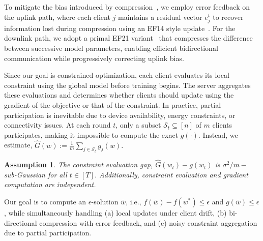 \documentclass{article} %
\newtheorem{assumption}[]{Assumption}
\begin{document}

To mitigate the bias introduced by compression~\citep{seide20141, karimireddy2019error, islamov2025safe}, we employ error feedback on the uplink path, where each client $j$ maintains a residual vector $e_j^t$ to recover information lost during compression using an EF14 style update~\citep{seide20141}. For the downlink path, we adopt a primal EF21 variant~\citep{gruntkowska2023ef21,islamov2025safe} that compresses the difference between successive model parameters, enabling efficient bidirectional communication while progressively correcting uplink bias.

Since our goal is constrained optimization, each client evaluates its local constraint using the global model before training begins. The server aggregates these evaluations and determines whether clients should update using the gradient of the objective or that of the constraint. In practice, partial participation is inevitable due to device availability, energy constraints, or connectivity issues. At each round $t$, only a subset $\mathcal{S}_t \subseteq [n]$ of $m$ clients participates, making it impossible to compute the exact $g(\cdot)$. Instead, we estimate,
$
\hat{G}(w) := \frac{1}{m} \sum_{j \in \mathcal{S}_t} g_j(w).
$
\begin{assumption}
\label{as:sub_gauss}
The constraint evaluation gap, $\hat{G}(w_t) - g(w_t)$ is $\sigma^2/m-$sub-Gaussian for all $t \in [T]$. Additionally, constraint evaluation and gradient computation are independent.
\end{assumption}

Our goal is to compute an $\epsilon$-solution $\bar{w}$, i.e., $f(\bar{w}) - f(w^\ast) \leq \epsilon$ and $g(\bar{w}) \leq \epsilon$, while simultaneously handling (a) local updates under client drift,
(b) bi-directional compression with error feedback, and
(c) noisy constraint aggregation due to partial participation.
\end{document}
